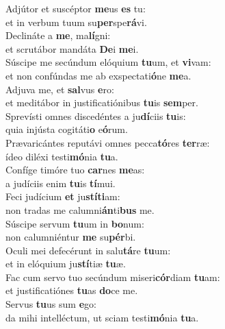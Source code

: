 \evenverse Adjútor et suscéptor \textbf{me}us \textbf{es} tu:~\*\\
\evenverse et in verbum tuum su\textbf{per}spe\textbf{rá}vi.\\
\oddverse Declináte a \textbf{me}, ma\textbf{lí}gni:~\*\\
\oddverse et scrutábor mandáta \textbf{De}i \textbf{me}i.\\
\evenverse Súscipe me secúndum elóquium \textbf{tu}um, et \textbf{vi}vam:~\*\\
\evenverse et non confúndas me ab exspectati\textbf{ó}ne \textbf{me}a.\\
\oddverse Adjuva me, et \textbf{sal}vus \textbf{e}ro:~\*\\
\oddverse et meditábor in justificatiónibus \textbf{tu}is \textbf{sem}per.\\
\evenverse Sprevísti omnes discedéntes a ju\textbf{dí}ciis \textbf{tu}is:~\*\\
\evenverse quia injústa cogitáti\textbf{o} e\textbf{ó}rum.\\
\oddverse Prævaricántes reputávi omnes pecca\textbf{tó}res \textbf{ter}ræ:~\*\\
\oddverse ídeo diléxi testi\textbf{mó}nia \textbf{tu}a.\\
\evenverse Confíge timóre tuo \textbf{car}nes \textbf{me}as:~\*\\
\evenverse a judíciis enim \textbf{tu}is \textbf{tí}mui.\\
\oddverse Feci judícium \textbf{et} ju\textbf{stí}\textbf{ti}am:~\*\\
\oddverse non tradas me calumni\textbf{án}ti\textbf{bus} me.\\
\evenverse Súscipe servum \textbf{tu}um in \textbf{bo}num:~\*\\
\evenverse non calumniéntur \textbf{me} su\textbf{pér}bi.\\
\oddverse Oculi mei defecérunt in salu\textbf{tá}re \textbf{tu}um:~\*\\
\oddverse et in elóquium ju\textbf{stí}tiæ \textbf{tu}æ.\\
\evenverse Fac cum servo tuo secúndum miseri\textbf{cór}diam \textbf{tu}am:~\*\\
\evenverse et justificatiónes \textbf{tu}as \textbf{do}ce me.\\
\oddverse Servus \textbf{tu}us sum \textbf{e}go:~\*\\
\oddverse da mihi intelléctum, ut sciam testi\textbf{mó}nia \textbf{tu}a.\\
